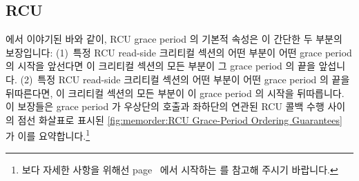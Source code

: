 







\subsection{RCU}
\label{sec:memorder:RCU}

 에서 이야기된 바와 같이, RCU grace period 의
기본적 속성은 이 간단한 두 부분의 보장입니다:
(1)~특정 RCU read-side 크리티컬 섹션의 어떤 부분이 어떤 grace period 의 시작을
앞선다면 이 크리티컬 섹션의 모든 부분이 그 grace period 의 끝을 앞섭니다.
(2)~특정 RCU read-side 크리티컬 섹션의 어떤 부분이 어떤 grace period 의 끝을
뒤따른다면, 이 크리티컬 섹션의 모든 부분이 이 grace period 의 시작을
뒤따릅니다.
이 보장들은 grace period 가 우상단의  호출과 좌하단의 연관된 RCU
콜백 수행 사이의 점선 화살표로 표시된
\cref{fig:memorder:RCU Grace-Period Ordering Guarantees}
가 이를 요약합니다.\footnote{
	보다 자세한 사항을 위해선
	page~\pageref{fig:defer:RCU Reader and Later Grace Period} 에서
	시작하는
	를 참고해 주시기 바랍니다.}

